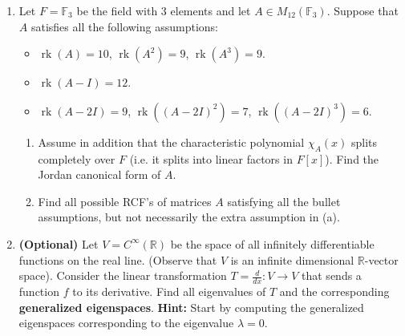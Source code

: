 \documentclass[12pt,
psamsfonts]{amsart}
\theoremstyle{remark}
\theoremstyle{definition}
\newcommand{\R}{\mathbb{R}\xspace}
\DeclareMathOperator{\rk}{rk}
\numberwithin{equation}{section}
\begin{document}
\begin{enumerate}
(a) $\left(\begin{array}{ccc}
-1 & 3 & 0\\
0 & 2 & 0 \\
2 & 1 & -1
\end{array}\right)$ \hspace{100 pt} (b)  $\left(\begin{array}{ccc}
1 & -1 & 1\\
1 & -1 & 1 \\
1 & -1 & 0
\end{array}\right)$. 
\\
\\
\item Let $F=\mathbb{F}_3$ be the field with $3$ elements and let $A\in M_{12}(\mathbb{F}_3)$. Suppose that $A$ satisfies all the following assumptions: 
\begin{itemize}
\item $\rk(A)=10$, \hspace{20pt} $\rk(A^2)=9$, \hspace{20pt} $\rk(A^3)=9$. 
\item $\rk(A-I)=12$. 
\item $\rk(A-2I)=9$, \hspace{20pt} $\rk((A-2I)^2)=7$, \hspace{20pt} $\rk((A-2I)^3)=6$. 
\end{itemize} 
\begin{enumerate}
\item Assume in addition that the characteristic polynomial $\chi_A(x)$ splits completely over $F$ (i.e. it splits into linear factors in $F[x]$). Find the Jordan canonical form of $A$. 
\item Find all possible RCF's of matrices $A$ satisfying all the bullet assumptions, but not necessarily the extra assumption in (a). 
\end{enumerate}
\medskip 
\medskip
\item \textbf{(Optional)} Let $V=C^\infty(\R)$ be the space of all infinitely differentiable functions on the real line. (Observe that $V$ is an infinite dimensional $\R$-vector space). Consider the linear transformation $T=\frac{d}{dx}:V\rightarrow V$ that sends a function $f$ to its derivative. Find all eigenvalues of $T$ and the corresponding \textbf{generalized eigenspaces}. \textbf{Hint:} Start by computing the generalized eigenspaces corresponding to the eigenvalue $\lambda=0$.  







\end{enumerate}
\end{document}
